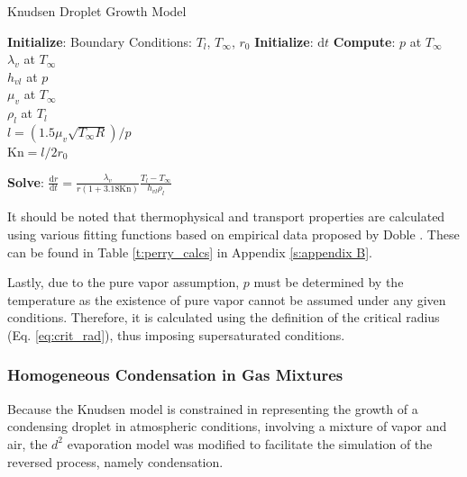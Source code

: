 \documentclass[12pt]{article}
\numberwithin{equation}{section}
\begin{document}
\begin{algorithm}
    \caption{Knudsen Droplet Growth Model}
    \label{alg:knudsen}
    \begin{algorithmic}[1]
    \State \textbf{Initialize}: Boundary Conditions: $T_{l}$, $T_{\infty}$, $r_{0}$ 
    \State \textbf{Initialize}: $\mathrm{d}t$ 
    \State \textbf{Compute}: $p$ at $T_{\infty}$ \\  
    \quad \quad \quad \quad \quad$\lambda_{v}$ at $T_{\infty}$ \\
    \quad \quad \quad \quad \quad $h_{vl}$ at $p$\\
    \quad \quad \quad \quad \quad$\mu_{v}$ at $T_{\infty}$\\
    \quad \quad \quad \quad \quad $\rho_{l}$ at $T_{l}$ \\
    \quad \quad \quad \quad \quad $l=(1.5\mu_{v}\sqrt{T_{\infty}R})/p$ \\ 
    \quad \quad \quad \quad \quad $\textrm{Kn}=l/2r_{0}$
    
    \State \textbf{Solve}: $\frac{\mathrm{d}r}{\mathrm{d}t}=\frac{\lambda_{v}}{r(1+3.18\textrm{Kn})}\frac{T_{l}-T_{\infty}}{h_{vl}\rho_{l}}$ 
    \end{algorithmic}
\end{algorithm}
It should be noted that thermophysical and transport properties are calculated using various fitting functions based on empirical data proposed by Doble \cite{doble2007perry}. These can be found in Table \ref{t:perry_calcs} in Appendix \ref{s:appendix B}.

Lastly, due to the pure vapor assumption, $p$ must be determined by the temperature as the existence of pure vapor cannot be assumed under any given conditions. Therefore, it is calculated using the definition of the critical radius (Eq. \ref{eq:crit_rad}), thus imposing supersaturated conditions. 

\subsubsection{Homogeneous Condensation in Gas Mixtures}\label{sss:Methodology-Droplet-mix}
Because the Knudsen model is constrained in representing the growth of a condensing droplet in atmospheric conditions, involving a mixture of vapor and air, the $d^{2}$ evaporation model was modified to facilitate the simulation of the reversed process, namely condensation.
\end{document}
